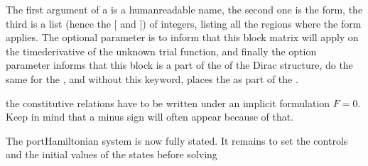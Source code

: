 \documentclass[letterpaper,10pt,english]{sphinxmanual}
\begin{document}
\begin{sphinxVerbatim}[commandchars=\\\{\}]
      \PYG{p}{[}\PYG{p}{]}
      \PYG{p}{[}\PYG{p}{]}
    \PYG{p}{]}

   
\end{sphinxVerbatim}

\sphinxAtStartPar
The first argument of a  is a human\sphinxhyphen{}readable name, the second one
is the form, the third is a list (hence the {[} and {]}) of integers,
listing all the regions where the form applies. The optional parameter
 is to inform  that this block matrix will apply on
the time\sphinxhyphen{}derivative of the unknown trial function, and finally the
option parameter  informs  that this block
is a part of the  of the Dirac structure,
 do the same for the , and without
this keyword,  places the  as part of the .

\sphinxAtStartPar
{} the constitutive relations have to be written under
an implicit formulation \(F = 0\). Keep in mind that a minus sign
will often appear because of that.

\sphinxAtStartPar
The port\sphinxhyphen{}Hamiltonian system is now fully stated. It remains to set the
controls and the initial values of the states before solving
\end{document}
